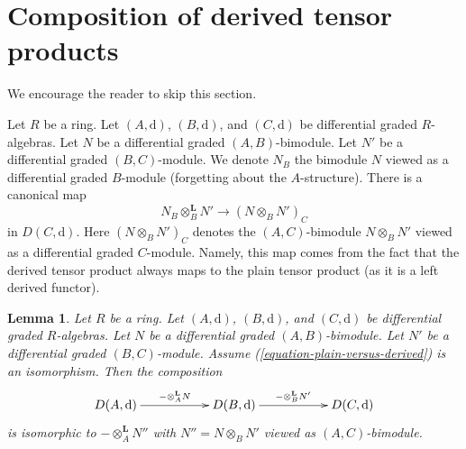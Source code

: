 \documentclass{stacks-project}
\theoremstyle{plain}
\newtheorem{lemma}[subsection]{Lemma}
\theoremstyle{definition}
\theoremstyle{remark}
\numberwithin{equation}{subsection}
\begin{document}
\section{Composition of derived tensor products}
\label{section-compose-tensor-functors}

\noindent
We encourage the reader to skip this section.

\medskip\noindent
Let $R$ be a ring. Let $(A, \text{d})$, $(B, \text{d})$, and
$(C, \text{d})$ be differential graded $R$-algebras.
Let $N$ be a differential graded $(A, B)$-bimodule.
Let $N'$ be a differential graded $(B, C)$-module.
We denote $N_B$ the bimodule $N$ viewed as a differential graded
$B$-module (forgetting about the $A$-structure). There is a canonical map
\begin{equation}
\label{equation-plain-versus-derived}
N_B \otimes_B^\mathbf{L} N'
\longrightarrow
(N \otimes_B N')_C
\end{equation}
in $D(C, \text{d})$. Here $(N \otimes_B N')_C$ denotes the
$(A, C)$-bimodule $N \otimes_B N'$ viewed as a
differential graded $C$-module. Namely, this map
comes from the fact that the derived tensor product always maps to the
plain tensor product (as it is a left derived functor).

\begin{lemma}
\label{lemma-compose-tensor-functors-general}
Let $R$ be a ring. Let $(A, \text{d})$, $(B, \text{d})$, and
$(C, \text{d})$ be differential graded $R$-algebras.
Let $N$ be a differential graded $(A, B)$-bimodule.
Let $N'$ be a differential graded $(B, C)$-module.
Assume (\ref{equation-plain-versus-derived}) is an isomorphism.
Then the composition
$$
\xymatrix{
D(A, \text{d}) \ar[rr]^{- \otimes_A^\mathbf{L} N} & &
D(B, \text{d}) \ar[rr]^{- \otimes_B^\mathbf{L} N'} & &
D(C, \text{d})
}
$$
is isomorphic to $- \otimes_A^\mathbf{L} N''$ with
$N'' = N \otimes_B N'$ viewed as $(A, C)$-bimodule.
\end{lemma}
\end{document}
